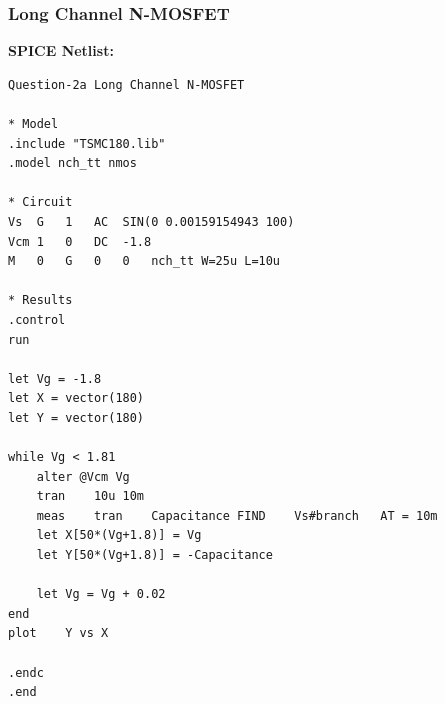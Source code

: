 \documentclass{article}
\begin{document}
\subsubsection{Long Channel N-MOSFET}
\textbf{SPICE Netlist:}
\begin{lstlisting}
Question-2a Long Channel N-MOSFET

* Model
.include "TSMC180.lib"
.model nch_tt nmos

* Circuit
Vs	G	1	AC	SIN(0 0.00159154943 100)
Vcm	1	0	DC	-1.8
M	0	G	0	0	nch_tt W=25u L=10u

* Results
.control
run

let Vg = -1.8
let X = vector(180)
let Y = vector(180)

while Vg < 1.81
	alter @Vcm Vg
	tran	10u	10m
	meas	tran	Capacitance	FIND	Vs#branch	AT = 10m
	let X[50*(Vg+1.8)] = Vg
	let Y[50*(Vg+1.8)] = -Capacitance

	let Vg = Vg + 0.02
end
plot	Y vs X

.endc
.end
\end{lstlisting}
\end{document}
